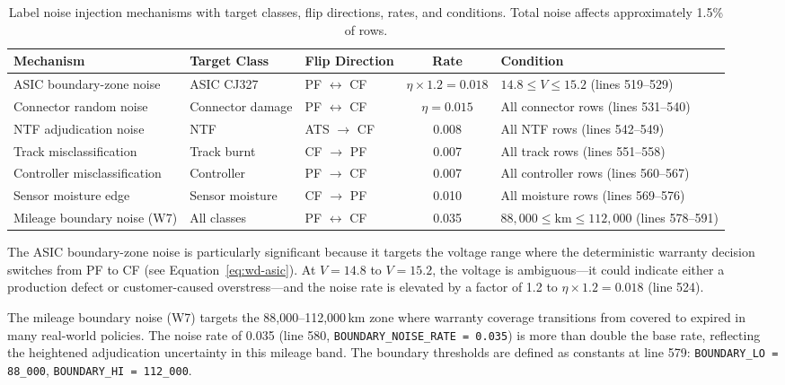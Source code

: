 \documentclass[10pt,a4paper]{article}
\begin{document}
\begin{table}[H]
\centering
\caption{Label noise injection mechanisms with target classes, flip directions, rates, and conditions. Total noise affects approximately 1.5\% of rows.}
\label{tab:label-noise}
\small
\begin{tabular}{lR{2cm}R{2.2cm}cR{4.5cm}}
\toprule
\textbf{Mechanism} & \textbf{Target Class} & \textbf{Flip Direction} & \textbf{Rate} & \textbf{Condition} \\
\midrule
ASIC boundary-zone noise & ASIC CJ327 & PF $\leftrightarrow$ CF & $\eta \times 1.2 = 0.018$ & $14.8 \leq V \leq 15.2$ (lines 519--529) \\
Connector random noise  & Connector damage & PF $\leftrightarrow$ CF & $\eta = 0.015$ & All connector rows (lines 531--540) \\
NTF adjudication noise  & NTF & ATS $\to$ CF & 0.008 & All NTF rows (lines 542--549) \\
Track misclassification & Track burnt & CF $\to$ PF & 0.007 & All track rows (lines 551--558) \\
Controller misclassification & Controller & PF $\to$ CF & 0.007 & All controller rows (lines 560--567) \\
Sensor moisture edge    & Sensor moisture & CF $\to$ PF & 0.010 & All moisture rows (lines 569--576) \\
Mileage boundary noise (W7) & All classes & PF $\leftrightarrow$ CF & 0.035 & $88{,}000 \leq \text{km} \leq 112{,}000$ (lines 578--591) \\
\bottomrule
\end{tabular}
\end{table}

The ASIC boundary-zone noise is particularly significant because it targets the voltage range where the deterministic warranty decision switches from PF to CF (see Equation~\ref{eq:wd-asic}). At $V = 14.8$ to $V = 15.2$, the voltage is ambiguous---it could indicate either a production defect or customer-caused overstress---and the noise rate is elevated by a factor of 1.2 to $\eta \times 1.2 = 0.018$ (line 524).

The mileage boundary noise (W7) targets the 88{,}000--112{,}000\,km zone where warranty coverage transitions from covered to expired in many real-world policies. The noise rate of 0.035 (line 580, \texttt{BOUNDARY\_NOISE\_RATE = 0.035}) is more than double the base rate, reflecting the heightened adjudication uncertainty in this mileage band. The boundary thresholds are defined as constants at line 579: \texttt{BOUNDARY\_LO = 88\_000}, \texttt{BOUNDARY\_HI = 112\_000}.
\end{document}

